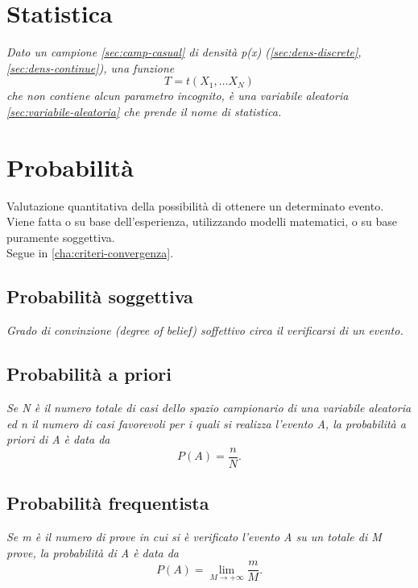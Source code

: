 \section{Statistica} %
\label{sec:statistica}
\emph{Dato un campione \ref{sec:camp-casual} di densità p(x) (\ref{sec:dens-discrete}, \ref{sec:dens-continue}), una funzione
\begin{equation}
T=t({ X }_{ 1 },\dots { X }_{ N })
\end{equation}
che non contiene alcun parametro incognito, è una variabile aleatoria \ref{sec:variabile-aleatoria} che prende il nome di statistica.}

\section{Probabilità} %
\label{sec:probabilità}
Valutazione quantitativa della possibilità di ottenere un determinato evento. Viene fatta o su base dell'esperienza, utilizzando modelli matematici, o su base puramente soggettiva. \\ Segue in \ref{cha:criteri-convergenza}.
\subsection{Probabilità soggettiva} %
\label{prob:soggettiva}
\emph{Grado di convinzione (degree of belief) soffettivo circa il verificarsi di un evento.}

\subsection{Probabilità a priori} %
\label{subsec:priori}
\emph{Se N è il numero totale di casi dello spazio campionario di una variabile aleatoria ed n il numero di casi favorevoli per i quali si realizza l'evento A, la probabilità a priori di A è data da
\begin{equation}
P(A)=\frac{n}{N} .
\end{equation}}

\subsection{Probabilità frequentista} %
\label{subsec:frequentista}
\emph{Se m è il numero di prove in cui si è verificato l'evento A su un totale di M prove, la probabilità di A è data da
\begin{equation}
P(A)=\lim_{M\to +\infty}\frac{m}{M}.
\end{equation}}

